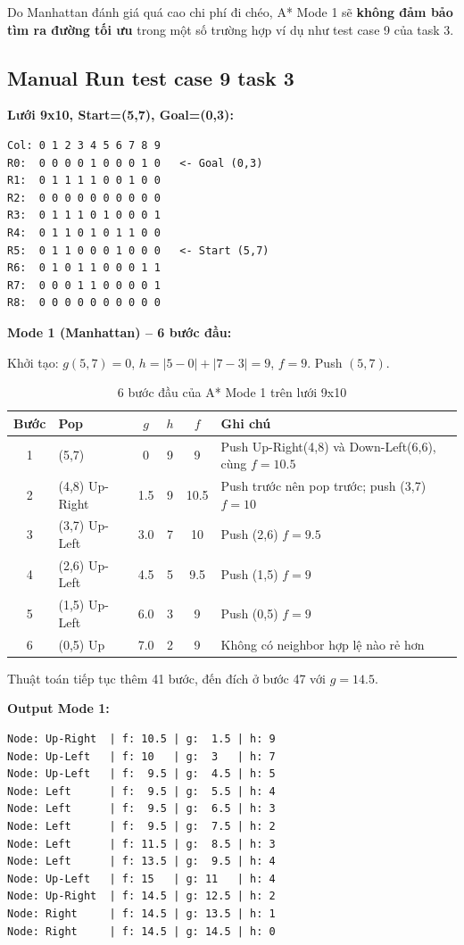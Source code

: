 \documentclass[13pt,a4paper]{article}
\begin{document}
Do Manhattan đánh giá quá cao chi phí đi chéo, A* Mode 1 sẽ \textbf{không đảm bảo tìm ra đường tối ưu} trong một số trường hợp ví dụ như test case 9 của task 3.

\subsection{Manual Run test case 9 task 3}

\textbf{Lưới 9x10, Start=(5,7), Goal=(0,3):}

\begin{lstlisting}[language={}, numbers=none]
Col: 0 1 2 3 4 5 6 7 8 9
R0:  0 0 0 0 1 0 0 0 1 0   <- Goal (0,3)
R1:  0 1 1 1 1 0 0 1 0 0
R2:  0 0 0 0 0 0 0 0 0 0
R3:  0 1 1 1 0 1 0 0 0 1
R4:  0 1 1 0 1 0 1 1 0 0
R5:  0 1 1 0 0 0 1 0 0 0   <- Start (5,7)
R6:  0 1 0 1 1 0 0 0 1 1
R7:  0 0 0 1 1 0 0 0 0 1
R8:  0 0 0 0 0 0 0 0 0 0
\end{lstlisting}

\textbf{Mode 1 (Manhattan) -- 6 bước đầu:}

Khởi tạo: $g(5,7)=0$, $h=|5-0|+|7-3|=9$, $f=9$. Push $(5,7)$.

\begin{table}[H]
\centering
\small
\begin{tabular}{clcccl}
\toprule
\textbf{Bước} & \textbf{Pop} & $g$ & $h$ & $f$ & \textbf{Ghi chú} \\
\midrule
1 & (5,7) & 0   & 9 & 9    & Push Up-Right(4,8) và Down-Left(6,6), cùng $f=10.5$ \\
2 & (4,8) Up-Right & 1.5 & 9 & 10.5 & Push trước nên pop trước; push (3,7) $f=10$ \\
3 & (3,7) Up-Left  & 3.0 & 7 & 10   & Push (2,6) $f=9.5$ \\
4 & (2,6) Up-Left  & 4.5 & 5 & 9.5  & Push (1,5) $f=9$ \\
5 & (1,5) Up-Left  & 6.0 & 3 & 9    & Push (0,5) $f=9$ \\
6 & (0,5) Up       & 7.0 & 2 & 9    & Không có neighbor hợp lệ nào rẻ hơn \\
\bottomrule
\end{tabular}
\caption{6 bước đầu của A* Mode 1 trên lưới 9x10}
\end{table}

Thuật toán tiếp tục thêm 41 bước, đến đích ở bước 47 với $g=14.5$.

\textbf{Output Mode 1:}
\begin{lstlisting}[language={}, numbers=none]
Node: Up-Right  | f: 10.5 | g:  1.5 | h: 9
Node: Up-Left   | f: 10   | g:  3   | h: 7
Node: Up-Left   | f:  9.5 | g:  4.5 | h: 5
Node: Left      | f:  9.5 | g:  5.5 | h: 4
Node: Left      | f:  9.5 | g:  6.5 | h: 3
Node: Left      | f:  9.5 | g:  7.5 | h: 2
Node: Left      | f: 11.5 | g:  8.5 | h: 3
Node: Left      | f: 13.5 | g:  9.5 | h: 4
Node: Up-Left   | f: 15   | g: 11   | h: 4
Node: Up-Right  | f: 14.5 | g: 12.5 | h: 2
Node: Right     | f: 14.5 | g: 13.5 | h: 1
Node: Right     | f: 14.5 | g: 14.5 | h: 0
\end{lstlisting}
\end{document}
